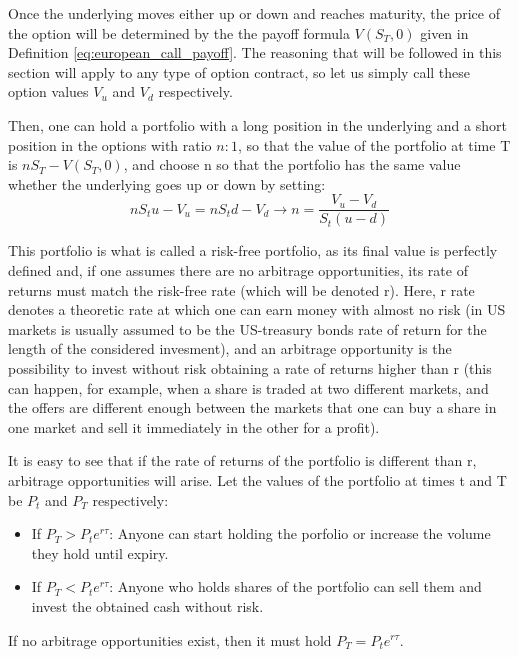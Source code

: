 \documentclass[12,twoside]{mammeTFM}
\theoremstyle{definition}
\theoremstyle{remark}
\begin{document}
Once the underlying moves either up or down and reaches maturity, the price of the option will be determined by the the payoff formula $V(S_T, 0)$ given in Definition \ref{eq:european_call_payoff}. The reasoning that will be followed in this section will apply to any type of option contract, so let us simply call these option values $V_u$ and $V_d$ respectively.

Then, one can hold a portfolio with a long position in the underlying and a short position in the options with ratio $n:1$, so that the value of the portfolio at time T is $n S_T - V(S_T, 0)$, and choose n so that the portfolio has the same value whether the underlying goes up or down by setting:
\begin{equation}
n S_t u - V_u = n S_t d - V_d \rightarrow n = \dfrac{V_u - V_d}{S_t(u - d)}
\end{equation}

This portfolio is what is called a risk-free portfolio, as its final value is perfectly defined and, if one assumes there are no arbitrage opportunities, its rate of returns must match the risk-free rate (which will be denoted r). Here, r rate denotes a theoretic rate at which one can earn money with almost no risk (in US markets is usually assumed to be the US-treasury bonds rate of return for the length of the considered invesment), and an arbitrage opportunity is the possibility to invest without risk obtaining a rate of returns higher than r (this can happen, for example, when a share is traded at two different markets, and the offers are different enough between the markets that one can buy a share in one market and sell it immediately in the other for a profit).

It is easy to see that if the rate of returns of the portfolio is different than r, arbitrage opportunities will arise. Let the values of the portfolio at times t and T be $P_t$ and $P_T$ respectively:
\begin{itemize}
\item If $P_T > P_t e^{r\tau}$: Anyone can start holding the porfolio or increase the volume they hold until expiry.
\item If $P_T < P_t e^{r\tau}$: Anyone who holds shares of the portfolio can sell them and invest the obtained cash without risk.
\end{itemize}
If no arbitrage opportunities exist, then it must hold $P_T = P_t e^{r\tau}$.
\end{document}
